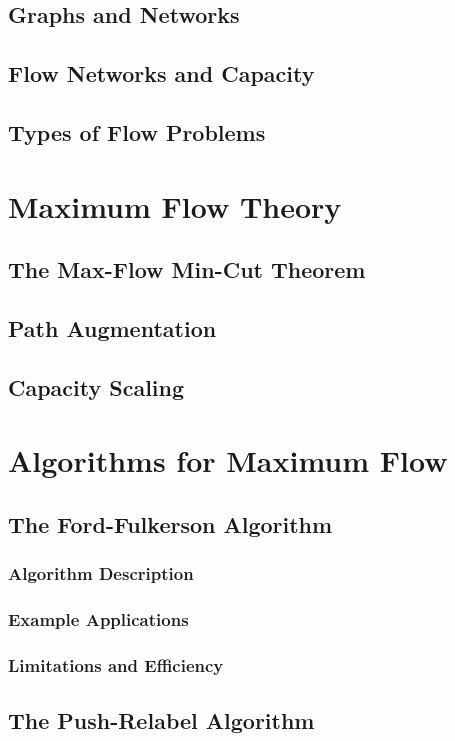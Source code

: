 \documentclass[12pt]{book} %
\begin{document}
\subsection{Graphs and Networks}
\subsection{Flow Networks and Capacity}
\subsection{Types of Flow Problems}

\section{Maximum Flow Theory}
\subsection{The Max-Flow Min-Cut Theorem}
\subsection{Path Augmentation}
\subsection{Capacity Scaling}

\section{Algorithms for Maximum Flow}
\subsection{The Ford-Fulkerson Algorithm}
\subsubsection{Algorithm Description}
\subsubsection{Example Applications}
\subsubsection{Limitations and Efficiency}
\subsection{The Push-Relabel Algorithm}
\end{document}
